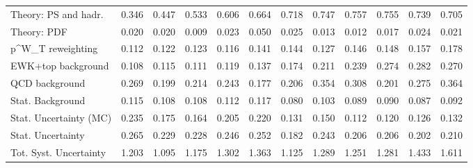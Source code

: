 \begin{tabular}{l|p{0.6cm}p{0.6cm}p{0.6cm}p{0.6cm}p{0.6cm}p{0.6cm}p{0.6cm}p{0.6cm}p{0.6cm}p{0.6cm}p{0.6cm}}
Theory: PS and hadr.                     & 0.346 & 0.447 & 0.533 & 0.606 & 0.664 & 0.718 & 0.747 & 0.757 & 0.755 & 0.739 & 0.705 \\
Theory: PDF                              & 0.020 & 0.020 & 0.009 & 0.023 & 0.050 & 0.025 & 0.013 & 0.012 & 0.017 & 0.024 & 0.021 \\
p^{W}_{T} reweighting                    & 0.112 & 0.122 & 0.123 & 0.116 & 0.141 & 0.144 & 0.127 & 0.146 & 0.148 & 0.157 & 0.178 \\
EWK+top background                       & 0.108 & 0.115 & 0.111 & 0.119 & 0.137 & 0.174 & 0.211 & 0.239 & 0.274 & 0.282 & 0.270 \\
QCD background                           & 0.269 & 0.199 & 0.214 & 0.243 & 0.177 & 0.206 & 0.354 & 0.308 & 0.201 & 0.275 & 0.364 \\
Stat. Background                         & 0.115 & 0.108 & 0.108 & 0.112 & 0.117 & 0.080 & 0.103 & 0.089 & 0.090 & 0.087 & 0.092 \\
Stat. Uncertainty (MC)                   & 0.235 & 0.175 & 0.164 & 0.205 & 0.220 & 0.131 & 0.150 & 0.112 & 0.120 & 0.126 & 0.132 \\
\hline
Stat. Uncertainty                        & 0.265 & 0.229 & 0.228 & 0.246 & 0.252 & 0.182 & 0.243 & 0.206 & 0.206 & 0.202 & 0.210 \\
\hline
Tot. Syst. Uncertainty                   & 1.203 & 1.095 & 1.175 & 1.302 & 1.363 & 1.125 & 1.289 & 1.251 & 1.281 & 1.433 & 1.611 \\
\hline
\end{tabular}
